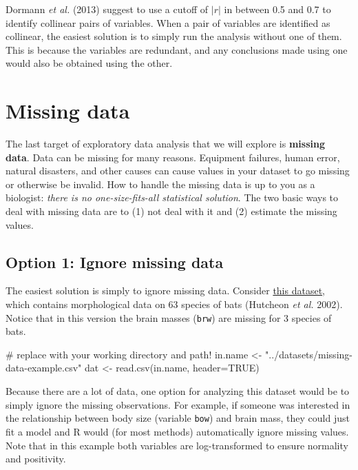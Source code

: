 \documentclass[
  13,
  letterpaper,
]{report}
\newenvironment{Shaded}{\begin{snugshade}}{\end{snugshade}}
\newcommand{\AttributeTok}[1]{\textcolor[rgb]{0.40,0.45,0.13}{#1}}
\newcommand{\CommentTok}[1]{\textcolor[rgb]{0.37,0.37,0.37}{#1}}
\newcommand{\ConstantTok}[1]{\textcolor[rgb]{0.56,0.35,0.01}{#1}}
\newcommand{\FunctionTok}[1]{\textcolor[rgb]{0.28,0.35,0.67}{#1}}
\newcommand{\NormalTok}[1]{\textcolor[rgb]{0.00,0.23,0.31}{#1}}
\newcommand{\OtherTok}[1]{\textcolor[rgb]{0.00,0.23,0.31}{#1}}
\newcommand{\StringTok}[1]{\textcolor[rgb]{0.13,0.47,0.30}{#1}}
\begin{document}
Dormann \emph{et al.} (2013) suggest to use a cutoff of \(|r|\) in
between 0.5 and 0.7 to identify collinear pairs of variables. When a
pair of variables are identified as collinear, the easiest solution is
to simply run the analysis without one of them. This is because the
variables are redundant, and any conclusions made using one would also
be obtained using the other.

\section{Missing data}\label{sec-problems-miss}

The last target of exploratory data analysis that we will explore is
\textbf{missing data}. Data can be missing for many reasons. Equipment
failures, human error, natural disasters, and other causes can cause
values in your dataset to go missing or otherwise be invalid. How to
handle the missing data is up to you as a biologist: \emph{there is no
one-size-fits-all statistical solution}. The two basic ways to deal with
missing data are to (1) not deal with it and (2) estimate the missing
values.

\subsection{Option 1: Ignore missing
data}\label{sec-problems-miss-ignore}

The easiest solution is simply to ignore missing data. Consider
\href{../datasets/missing-data-example.csv}{this dataset}, which
contains morphological data on 63 species of bats (Hutcheon \emph{et
al.} 2002). Notice that in this version the brain masses (\texttt{brw})
are missing for 3 species of bats.

\begin{Shaded}
\begin{Highlighting}[]
\CommentTok{\# replace with your working directory and path!}
\NormalTok{in.name }\OtherTok{\textless{}{-}} \StringTok{"../datasets/missing{-}data{-}example.csv"}
\NormalTok{dat }\OtherTok{\textless{}{-}} \FunctionTok{read.csv}\NormalTok{(in.name, }\AttributeTok{header=}\ConstantTok{TRUE}\NormalTok{)}
\end{Highlighting}
\end{Shaded}

Because there are a lot of data, one option for analyzing this dataset
would be to simply ignore the missing observations. For example, if
someone was interested in the relationship between body size (variable
\texttt{bow}) and brain mass, they could just fit a model and R would
(for most methods) automatically ignore missing values. Note that in
this example both variables are log-transformed to ensure normality and
positivity.
\end{document}
